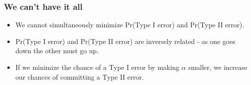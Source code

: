 \begin{frame}
\frametitle{We can't have it all}
\begin{itemize}
    \item
    We cannot simultaneously minimize Pr(Type I error) and Pr(Type II error).
    \item
    Pr(Type I error) and Pr(Type II error) are inversely related - as one goes down the other must go up.
    \item
    If we minimize the chance of a Type I error by making $\alpha$ smaller, we increase our chances of committing a Type II error.
\end{itemize}
\end{frame}



